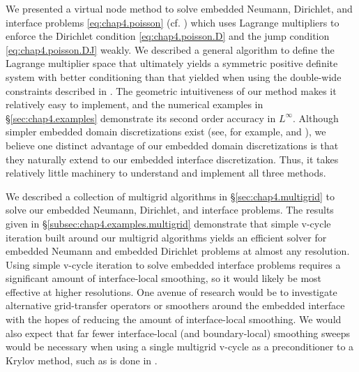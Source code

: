 We presented a virtual node method to solve embedded Neumann, Dirichlet, and interface problems \eqref{eq:chap4.poisson} (cf. \cite{Bedrossian10}) which uses Lagrange multipliers to enforce the Dirichlet condition \eqref{eq:chap4.poisson.D} and the jump condition \eqref{eq:chap4.poisson.DJ} weakly. We described a general algorithm to define the Lagrange multiplier space that ultimately yields a symmetric positive definite system with better conditioning than that yielded when using the double-wide constraints described in \cite{Bedrossian10}. The geometric intuitiveness of our method makes it relatively easy to implement, and the numerical examples in \S\ref{sec:chap4.examples} demonstrate its second order accuracy in $L^{\infty}$. Although simpler embedded domain discretizations exist (see, for example, \cite{Gibou02} and \cite{Ng.YenTing09}), we believe one distinct advantage of our embedded domain discretizations is that they naturally extend to our embedded interface discretization. Thus, it takes relatively little machinery to understand and implement all three methods.

We described a collection of multigrid algorithms in \S\ref{sec:chap4.multigrid} to solve our embedded Neumann, Dirichlet, and interface problems. The results given in \S\ref{subsec:chap4.examples.multigrid} demonstrate that simple v-cycle iteration built around our multigrid algorithms yields an efficient solver for embedded Neumann and embedded Dirichlet problems at almost any resolution. Using simple v-cycle iteration to solve embedded interface problems requires a significant amount of interface-local smoothing, so it would likely be most effective at higher resolutions. One avenue of research would be to investigate alternative grid-transfer operators or smoothers around the embedded interface with the hopes of reducing the amount of interface-local smoothing. We would also expect that far fewer interface-local (and boundary-local) smoothing sweeps would be necessary when using a single multigrid v-cycle as a preconditioner to a Krylov method, such as is done in \cite{McAdams10}.
